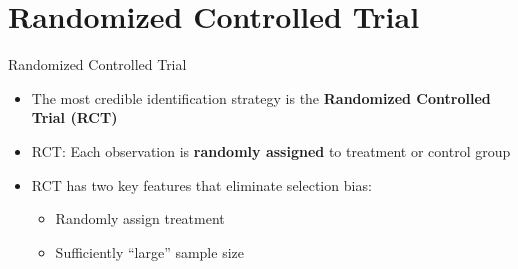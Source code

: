 \documentclass[hyperref={pdfpagelabels=false}]{beamer}
\begin{document}





\date
{}


\begin{frame}{}
	\titlepage
\end{frame}
	
	
	
	
	
	\section{Randomized Controlled Trial}
	
	\begin{frame}{Randomized Controlled Trial}
		\begin{itemize}
			\item The most credible identification strategy is the \textbf{Randomized Controlled Trial (RCT)}
			\vspace{0.3cm}
			\item RCT: Each observation is \textbf{randomly assigned} to treatment or control group
			\vspace{0.3cm}
			\item RCT has two key features that eliminate selection bias:
			\vspace{0.2cm}
			\begin{itemize}
				\item[1] Randomly assign treatment
				\vspace{0.2cm}
				\item[2] Sufficiently ``large'' sample size
			\end{itemize}
		\end{itemize}
	\end{frame}
	
\end{document}
